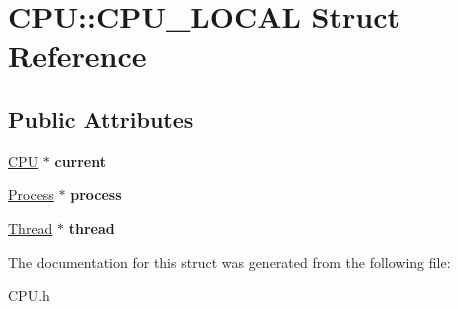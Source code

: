 \hypertarget{struct_c_p_u_1_1_c_p_u___l_o_c_a_l}{}\section{C\+PU\+:\+:C\+P\+U\+\_\+\+L\+O\+C\+AL Struct Reference}
\label{struct_c_p_u_1_1_c_p_u___l_o_c_a_l}
\subsection*{Public Attributes}
\begin{DoxyCompactItemize}
\item 
\mbox{\label{struct_c_p_u_1_1_c_p_u___l_o_c_a_l_ac90314334fe7fde1c64a3595f2050c5c}} 
\hyperlink{class_c_p_u}{C\+PU} $\ast$ {\bfseries current}
\item 
\mbox{\label{struct_c_p_u_1_1_c_p_u___l_o_c_a_l_ad96c7e38163009a55905ad1f9c058a81}} 
\hyperlink{class_process}{Process} $\ast$ {\bfseries process}
\item 
\mbox{\label{struct_c_p_u_1_1_c_p_u___l_o_c_a_l_aabcc35c9e5586aad05df2ea03bbc6dcf}} 
\hyperlink{class_thread}{Thread} $\ast$ {\bfseries thread}
\end{DoxyCompactItemize}


The documentation for this struct was generated from the following file\+:\begin{DoxyCompactItemize}
\item 
C\+P\+U.\+h\end{DoxyCompactItemize}
